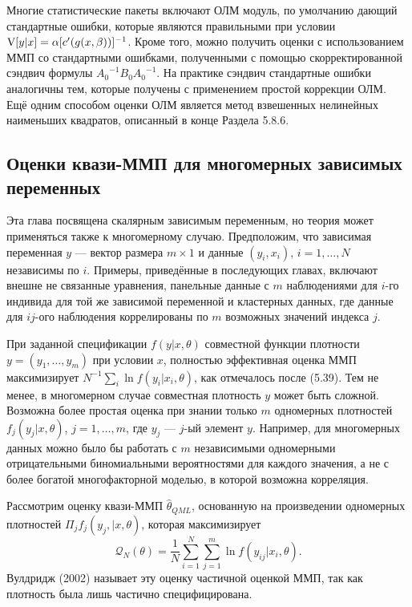 Многие статистические пакеты включают ОЛМ модуль, по умолчанию дающий стандартные ошибки, которые являются правильными при условии $\mathrm{V}[y|x]=\alpha [c'(g(x,\beta))]^{-1}$. Кроме того, можно получить оценки с использованием ММП со стандартными ошибками, полученными с помощью скорректированной сэндвич формулы ${A_0}^{-1}B_0{A_0}^{-1}$. На практике сэндвич стандартные ошибки аналогичны тем, которые получены с применением простой коррекции ОЛМ. Ещё одним способом оценки ОЛМ является метод взвешенных нелинейных наименьших квадратов, описанный в конце Раздела 5.8.6.

\subsection{Оценки квази-ММП для многомерных зависимых переменных}

Эта глава посвящена скалярным зависимым переменным, но теория может применяться также к многомерному случаю. Предположим, что зависимая переменная $y$ --- вектор размера $m \times 1$ и данные $(y_i,x_i)$, $i=1,\dots, N$ независимы по $i$. Примеры, приведённые в последующих главах, включают внешне не связанные уравнения, панельные данные с $m$ наблюдениями для $i$-го индивида для той же зависимой переменной и кластерных данных, где данные для $i j$-ого наблюдения коррелированы по $m$ возможных значений индекса $j$.

При заданной спецификации $f(y|x,\theta)$ совместной функции плотности $y=(y_1, \dots, y_m)$ при условии $x$, полностью эффективная оценка ММП максимизирует $N^{-1} \sum_i \ln f(y_i|x_i,\theta)$, как отмечалось после (5.39). Тем не менее, в многомерном случае совместная плотность $y$ может быть сложной. Возможна более простая оценка при знании только $m$ одномерных плотностей $f_j(y_j|x,\theta)$, $j=1,\dots,m$, где $y_j$ --- $j$-ый элемент $y$. Например, для многомерных данных можно было бы работать с $m$ независимыми одномерными отрицательными биномиальными вероятностями для каждого значения, а не с более богатой многофакторной моделью, в которой возможна корреляция.

Рассмотрим  оценку квази-ММП $\hat{\theta}_{QML}$, основанную на произведении одномерных плотностей $\Pi_j f_j(y_j,|x,\theta)$, которая максимизирует
\begin{equation}
\mathcal{Q}_{N}(\theta)=\frac{1}{N} \sum_{i=1}^{N} \sum_{j=1}^{m} \ln f(y_{ij}|x_i,\theta).
\end{equation}
Вулдридж (2002) называет эту оценку частичной оценкой ММП, так как плотность была лишь частично специфицирована. 


